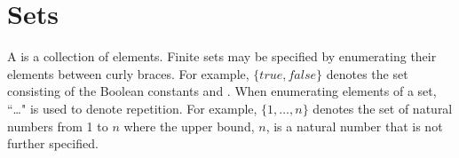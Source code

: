 
%
%
%
%
%
 

\section{Sets}\label{sec:informal_sets}

\pn A  is a collection of elements.  Finite sets may be specified by enumerating their elements between curly braces.  For example, \(\{true, false\}\) denotes the set consisting of the Boolean constants  and .  When enumerating elements of a set, ``\ldots" is used to denote repetition.  For example, \(\{1, 
\ldots, n\}\) denotes the set of natural numbers from 1 to $n$ where the upper bound, $n$, is a natural number that is not further specified.

